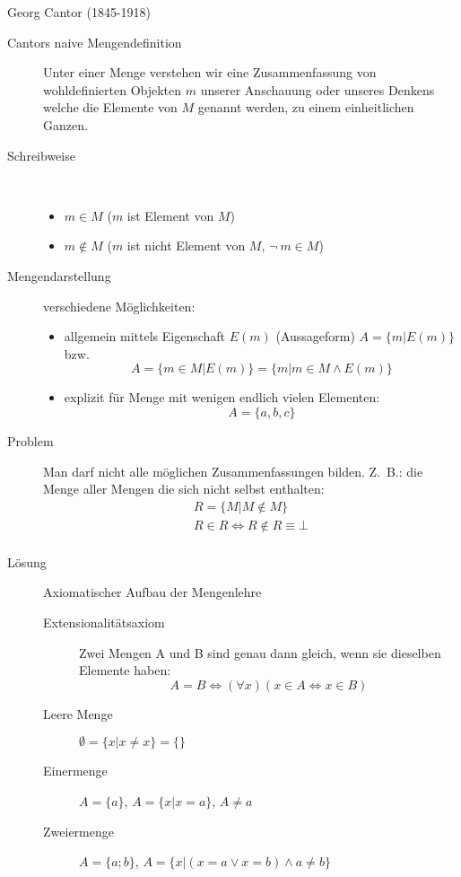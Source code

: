 Georg Cantor (1845-1918)
\begin{description}
    \item[Cantors naive Mengendefinition] Unter einer Menge verstehen wir eine Zusammenfassung von wohldefinierten Objekten $m$ unserer Anschauung oder unseres Denkens welche die Elemente von $M$ genannt werden, zu einem einheitlichen Ganzen.
    \item[Schreibweise]\
    \begin{itemize}
        \item $m \in M$ ($m$ ist Element von $M$)
        \item $m \not\in M$ ($m$ ist nicht Element von $M$, $\neg\ m \in M$)
    \end{itemize}
    \item[Mengendarstellung] verschiedene Möglichkeiten:
    \begin{itemize}
        \item allgemein mittels Eigenschaft $E(m)$ (Aussageform) $A=\lbrace m|E(m) \rbrace$ bzw.
        \[A = \lbrace m \in M | E(m) \rbrace = \lbrace m | m \in M \wedge E(m) \rbrace\]
        \item explizit für Menge mit wenigen endlich vielen Elementen:
        \[A=\lbrace a, b, c\rbrace\]
    \end{itemize}
    \item[Problem] Man darf nicht alle möglichen Zusammenfassungen bilden.
    Z.~B.: die Menge aller Mengen die sich nicht selbst enthalten:
    \begin{gather*}
        R=\lbrace M | M \not \in M \rbrace\\
        R \in R \Leftrightarrow R \not \in R \equiv \bot\\
    \end{gather*}
    \item[Lösung] Axiomatischer Aufbau der Mengenlehre
    \begin{description}
        \item[Extensionalitätsaxiom] Zwei Mengen A und B sind genau dann gleich, wenn sie dieselben Elemente haben:
        \[A = B \Leftrightarrow (\forall x)(x \in A \Leftrightarrow x \in B)\]
        \item[Leere Menge] $\emptyset = \lbrace x | x \not = x\rbrace = \lbrace\rbrace$
        \item[Einermenge] $A=\lbrace a \rbrace$, $A = \lbrace x | x = a \rbrace$, $A \not = a$
        \item[Zweiermenge] $A=\lbrace a; b \rbrace$, $A = \lbrace x|(x=a \vee x=b) \wedge a \not = b \rbrace$

\end{description}
\end{description}
